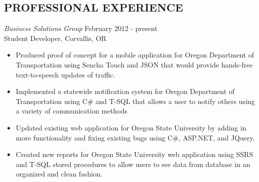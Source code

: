 \documentclass{res}
\begin{document}
\begin{resume}
\vspace{0.2in}
\section{PROFESSIONAL EXPERIENCE}
\vspace{8pt}
{\sl Business Solutions Group} \hfill        February 2012 - present \\
Student Developer, Corvallis, OR

   \begin{itemize} \itemsep -1pt %
   \item Produced proof of concept for a mobile application for Oregon Department of Transportation using Sencha Touch and JSON that would provide hands-free text-to-speech updates of traffic.
   \item Implemented a statewide notification system for Oregon Department of Transportation using C\# and T-SQL that allows a user to notify others using a variety of communication methods
   \item Updated existing web application for Oregon State University by adding in more functionality and fixing existing bugs using C\#, ASP.NET, and JQuery.
   \item Created new reports for Oregon State University web application using SSRS and T-SQL stored procedures to allow users to see data from database in an organized and clean fashion.
 \end{itemize}
\end{resume}
\end{document}
